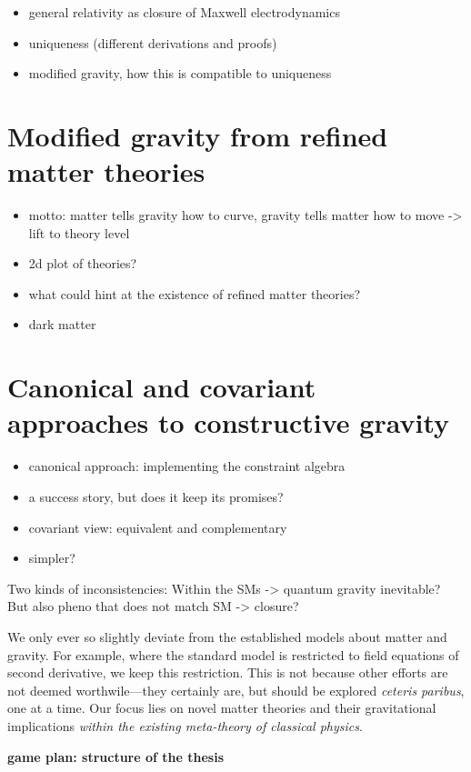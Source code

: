 \begin{itemize}
\item general relativity as closure of Maxwell electrodynamics
\item uniqueness (different derivations and proofs)
\item modified gravity, how this is compatible to uniqueness
\end{itemize}

\section{Modified gravity from refined matter theories}

\begin{itemize}
\item motto: matter tells gravity how to curve, gravity tells matter how to move -> lift to theory level
\item 2d plot of theories?
\item what could hint at the existence of refined matter theories?
\item dark matter
\end{itemize}

\section{Canonical and covariant approaches to constructive gravity}

\begin{itemize}
\item canonical approach: implementing the constraint algebra
\item a success story, but does it keep its promises?
\item covariant view: equivalent and complementary
\item simpler?
\end{itemize}

Two kinds of inconsistencies: Within the SMs -> quantum gravity inevitable? But also pheno that does not match SM -> closure?

We only ever so slightly deviate from the established models about matter and gravity. For example, where the standard model is restricted to field equations of second derivative, we keep this restriction. This is not because other efforts are not deemed worthwile---they certainly are, but should be explored \emph{ceteris paribus}, one at a time. Our focus lies on novel matter theories and their gravitational implications \emph{within the existing meta-theory of classical physics}.

\textbf{game plan: structure of the thesis}
